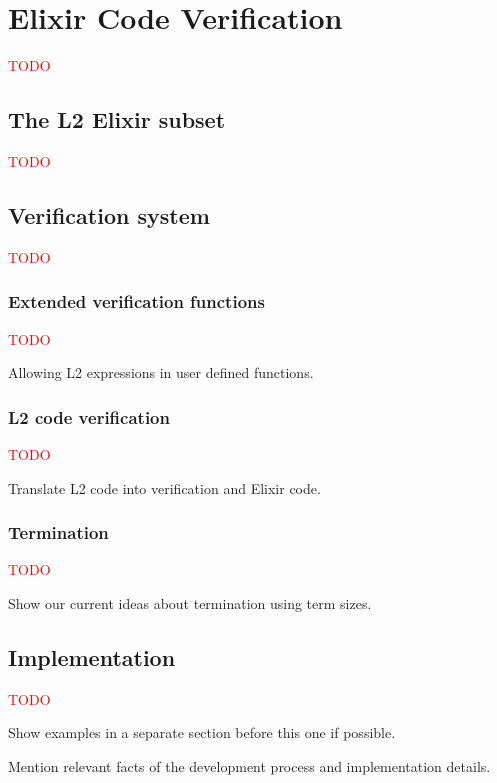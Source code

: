 \chapter{Elixir Code Verification}
\label{cap:elixirCodeVerification}

\textcolor{red}{TODO}

\section{The L2 Elixir subset}

\textcolor{red}{TODO}

\section{Verification system}

\textcolor{red}{TODO}

\subsection{Extended verification functions}

\textcolor{red}{TODO}

Allowing L2 expressions in user defined functions.

\subsection{L2 code verification}

\textcolor{red}{TODO}

Translate L2 code into verification and Elixir code.

\subsection{Termination}

\textcolor{red}{TODO}

Show our current ideas about termination using term sizes.

\section{Implementation}

\textcolor{red}{TODO}

Show examples in a separate section before this one if possible.

Mention relevant facts of the development process and implementation details.
